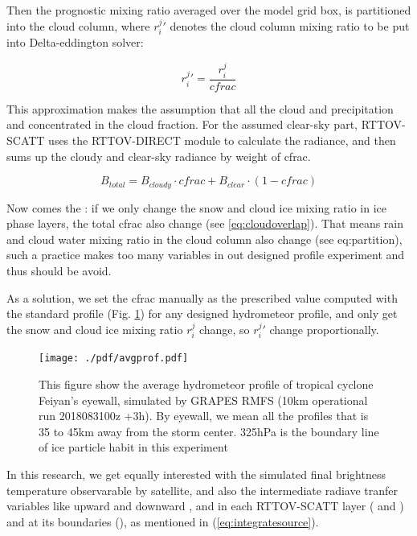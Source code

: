 Then the prognostic mixing ratio averaged over the model grid box, is partitioned into the cloud column,
where $r_{i}^{j}\prime$ denotes the cloud column mixing ratio to be put into Delta-eddington solver:

\begin{equation} \label{eq:partition}
    r_{i}^{j}\prime = \frac{r_{i}^{j}}{cfrac} 
\end{equation}

This approximation makes the assumption that all the cloud and precipitation and concentrated in the cloud fraction.
For the assumed clear-sky part, RTTOV-SCATT uses the RTTOV-DIRECT module to calculate the radiance, and then sums up the cloudy
and clear-sky radiance by weight of cfrac.

\begin{equation} \label{eq:sumup}
    B_{total} = B_{cloudy} \cdot cfrac + B_{clear} \cdot (1 - cfrac)  
\end{equation}

Now comes the : if we only change the snow and cloud ice mixing ratio in ice phase layers, the total cfrac
also change (see \ref{eq:cloudoverlap}). That means rain and cloud water mixing ratio in the cloud column also change (see eq:partition),
such a practice makes too many variables in out designed profile experiment and thus should be avoid.

As a solution, we set the cfrac manually as the prescribed value computed with the standard profile (Fig. \ref{fig:stdprofile}) for any designed hydrometeor profile, 
and only get the snow and cloud ice mixing ratio $r_{i}^{j}$ change, so $r_{i}^{j}\prime$ change proportionally.

\begin{figure}[hbtp] 
\centering
\texttt{[image: ./pdf/avgprof.pdf]} 
\caption{This figure show the average hydrometeor profile of 
tropical cyclone Feiyan's eyewall, simulated by GRAPES RMFS (10km operational run 2018083100z +3h).
By eyewall, we mean all the profiles that is 35 to 45km away from the storm center.
325hPa is the boundary line of ice particle habit in this experiment}
\label{fig:stdprofile}
\end{figure}

In this research, we get equally interested with the simulated final brightness temperature observarable by satellite,
and also the intermediate radiave tranfer variables like upward and downward ,  and
 in each RTTOV-SCATT layer ( and ) and at its boundaries (), 
as mentioned in (\ref{eq:integratesource}).

